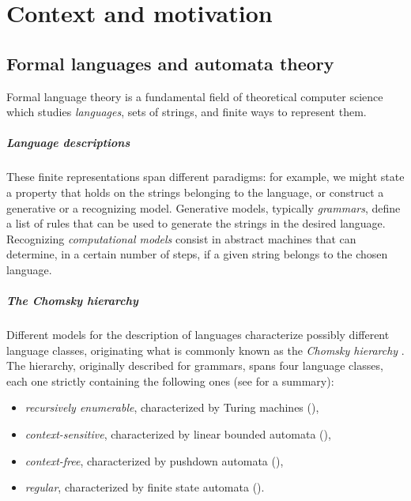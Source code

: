 \chapter{Context and motivation}



\section{Formal languages and automata theory}
Formal language theory is a fundamental field of theoretical computer science which studies \emph{languages}, \ie sets of strings, and finite ways to represent them.

\paragraph{Language descriptions} These finite representations span different paradigms: for example, we might state a property that holds on the strings belonging to the language, or construct a generative or a recognizing model.
Generative models, typically \emph{grammars}, define a list of rules that can be used to generate the strings in the desired language.
Recognizing \emph{computational models} consist in abstract machines that can determine, in a certain number of steps, if a given string belongs to the chosen language.

\paragraph{The Chomsky hierarchy} Different models for the description of languages characterize possibly different language classes, originating what is commonly known as the \emph{Chomsky hierarchy} \cite{Cho56}.
The hierarchy, originally described for grammars, spans four language classes, each one strictly containing the following ones (see  for a summary):
\begin{itemize}
	\item \emph{recursively enumerable}, characterized by Turing machines (\TM),
	\item \emph{context-sensitive}, characterized by linear bounded automata (\LBA),
	\item \emph{context-free}, characterized by pushdown automata (\PDA),
	\item \emph{regular}, characterized by finite state automata (\DFA).
\end{itemize}

